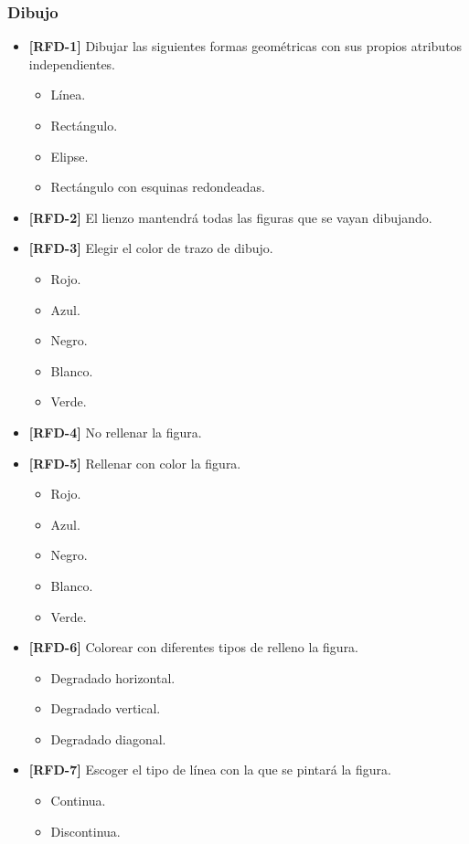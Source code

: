 \subsubsection{Dibujo}
\begin{itemize}
\item{\textbf{[RFD-1]} Dibujar las siguientes formas geométricas con sus propios atributos independientes.
\begin{itemize}
\item{Línea.}
\item{Rectángulo.}
\item{Elipse.}
\item{Rectángulo con esquinas redondeadas.}
\end{itemize}
}
\item{\textbf{[RFD-2]} El lienzo mantendrá todas las figuras que se vayan dibujando.}
\item{\textbf{[RFD-3]} Elegir el color de trazo de dibujo.
\begin{itemize}
\item{Rojo.}
\item{Azul.}
\item{Negro.}
\item{Blanco.}
\item{Verde.}
\end{itemize}
}
\item{\textbf{[RFD-4]} No rellenar la figura.}
\item{\textbf{[RFD-5]} Rellenar con color la figura.
\begin{itemize}
\item{Rojo.}
\item{Azul.}
\item{Negro.}
\item{Blanco.}
\item{Verde.}
\end{itemize}
}
\item{\textbf{[RFD-6]} Colorear con diferentes tipos de relleno la figura.}
\begin{itemize}
\item{Degradado horizontal.}
\item{Degradado vertical.}
\item{Degradado diagonal.}
\end{itemize}
\item{\textbf{[RFD-7]} Escoger el tipo de línea con la que se pintará la figura.}
\begin{itemize}
\item{Continua.}
\item{Discontinua.}

\end{itemize}
\end{itemize}
